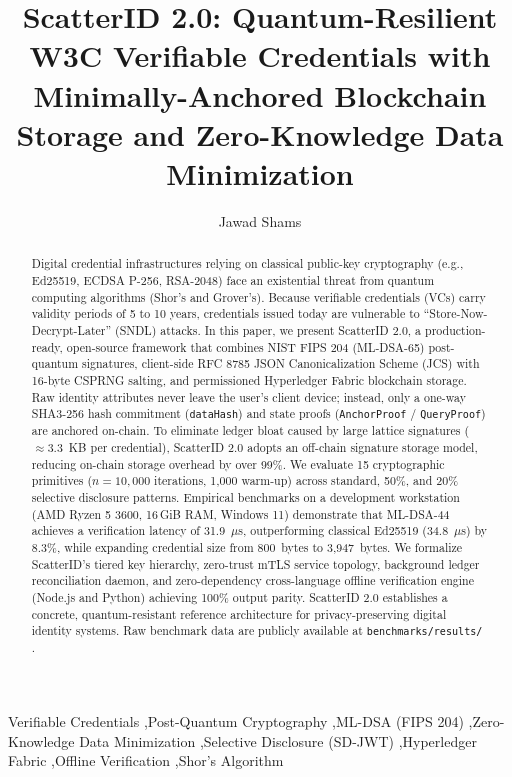 \documentclass[5p,times,authoryear]{elsarticle}
\begin{document}
\begin{frontmatter}

\title{ScatterID 2.0: Quantum-Resilient W3C Verifiable Credentials with Minimally-Anchored Blockchain Storage and Zero-Knowledge Data Minimization}

\author[KFUEIT]{Jawad Shams}
\address[KFUEIT]{Khawaja Fareed University of Engineering and Information Technology, Rahim Yar Khan, Pakistan}

\begin{abstract}
Digital credential infrastructures relying on classical public-key cryptography (e.g., Ed25519, ECDSA P-256, RSA-2048) face an existential threat from quantum computing algorithms (Shor's and Grover's). Because verifiable credentials (VCs) carry validity periods of 5 to 10 years, credentials issued today are vulnerable to ``Store-Now-Decrypt-Later'' (SNDL) attacks. In this paper, we present ScatterID 2.0, a production-ready, open-source framework that combines NIST FIPS 204 (ML-DSA-65) post-quantum signatures, client-side RFC 8785 JSON Canonicalization Scheme (JCS) with 16-byte CSPRNG salting, and permissioned Hyperledger Fabric blockchain storage. Raw identity attributes never leave the user's client device; instead, only a one-way SHA3-256 hash commitment (\texttt{dataHash}) and state proofs (\texttt{AnchorProof} / \texttt{QueryProof}) are anchored on-chain. To eliminate ledger bloat caused by large lattice signatures ($\approx 3.3$~KB per credential), ScatterID 2.0 adopts an off-chain signature storage model, reducing on-chain storage overhead by over 99\%. We evaluate 15 cryptographic primitives ($n = 10{,}000$ iterations, 1,000 warm-up) across standard, 50\%, and 20\% selective disclosure patterns. Empirical benchmarks on a development workstation (AMD Ryzen 5 3600, 16\,GiB RAM, Windows 11) demonstrate that ML-DSA-44 achieves a verification latency of 31.9~$\mu$s, outperforming classical Ed25519 (34.8~$\mu$s) by 8.3\%, while expanding credential size from 800~bytes to 3,947~bytes. We formalize ScatterID's tiered key hierarchy, zero-trust mTLS service topology, background ledger reconciliation daemon, and zero-dependency cross-language offline verification engine (Node.js and Python) achieving 100\% output parity. ScatterID 2.0 establishes a concrete, quantum-resistant reference architecture for privacy-preserving digital identity systems. Raw benchmark data are publicly available at \texttt{benchmarks/results/} \cite{shams2026benchmarks}.
\end{abstract}

\begin{keyword}
Verifiable Credentials \sep Post-Quantum Cryptography \sep ML-DSA (FIPS 204) \sep Zero-Knowledge Data Minimization \sep Selective Disclosure (SD-JWT) \sep Hyperledger Fabric \sep Offline Verification \sep Shor's Algorithm
\end{keyword}

\end{frontmatter}
\end{document}

